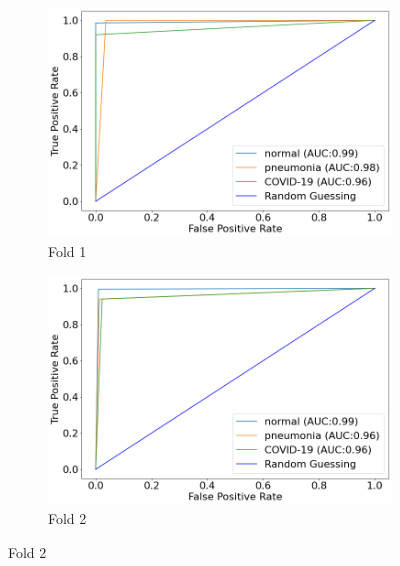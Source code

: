 \begin{figure}
     \centering
     \begin{subfigure}[b]{0.49\textwidth}
         \centering
         \includegraphics[width=\textwidth]{figures/au-roc-1.png}
         \caption{Fold 1}
         \label{fig:auroc-fold-1}
     \end{subfigure}
     \hfill
     \begin{subfigure}[b]{0.49\textwidth}
         \centering
         \includegraphics[width=\textwidth]{figures/au-roc-2.png}
         \caption{Fold 2}
         \label{fig:auroc-fold-2}
     \end{subfigure}
     

\end{figure}

